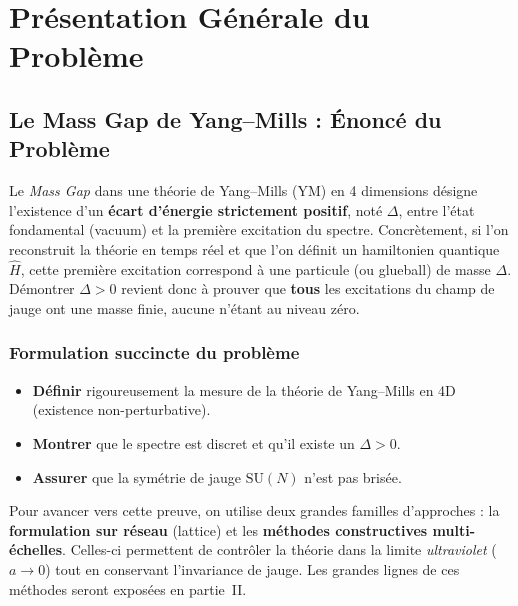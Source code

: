 \chapter{Présentation Générale du Problème}
\label{chap:1}

\section{Le Mass Gap de Yang--Mills : Énoncé du Problème}
\label{sec:1.1}

Le \emph{Mass Gap} dans une théorie de Yang--Mills (YM) en 4 dimensions désigne l’existence d’un \textbf{écart d’énergie strictement positif}, noté \(\Delta\), entre l’état fondamental (\og vacuum\fg) et la première excitation du spectre. Concrètement, si l’on reconstruit la théorie en temps réel et que l’on définit un hamiltonien quantique \(\widehat{H}\), cette première excitation correspond à une particule (ou \og glueball\fg) de masse \(\Delta\). Démontrer \(\Delta > 0\) revient donc à prouver que \textbf{tous} les excitations du champ de jauge ont une masse finie, aucune n’étant au niveau zéro.

\subsection*{Formulation succincte du problème}

\begin{itemize}
	\item \textbf{Définir} rigoureusement la mesure de la théorie de Yang--Mills en 4D (existence non-perturbative).
	\item \textbf{Montrer} que le spectre est discret et qu’il existe un \(\Delta > 0\).
	\item \textbf{Assurer} que la symétrie de jauge \(\mathrm{SU}(N)\) n’est pas brisée.
\end{itemize}

Pour avancer vers cette preuve, on utilise deux grandes familles d’approches : la \textbf{formulation sur réseau} (lattice) et les \textbf{méthodes constructives multi-échelles}. Celles-ci permettent de contrôler la théorie dans la limite \emph{ultraviolet} (\(a \to 0\)) tout en conservant l’invariance de jauge. Les grandes lignes de ces méthodes seront exposées en partie~II.

